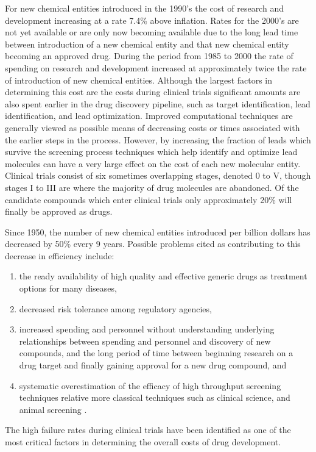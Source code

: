For new chemical entities introduced in the 1990's the cost of research and development increasing at a rate 7.4\% above inflation.
Rates for the 2000's are not yet available or are only now becoming available due to the long lead time between introduction of a new chemical entity and that new chemical entity becoming an approved drug.
During the period from 1985 to 2000 the rate of spending on research and development increased at approximately twice the rate of introduction of new chemical entities.
Although the largest factors in determining this cost are the costs during clinical trials significant amounts are also spent earlier in the drug discovery pipeline, such as target identification, lead identification, and lead optimization.
Improved computational techniques are generally viewed as possible means of decreasing costs or times associated with the earlier steps in the process.
However, by increasing the fraction of leads which survive the screening process techniques which help identify and optimize lead molecules can have a very large effect on the cost of each new molecular entity.
Clinical trials consist of six sometimes overlapping stages, denoted 0 to V, though stages I to III are where the majority of drug molecules are abandoned.
Of the candidate compounds which enter clinical trials only approximately 20\% will finally be approved as drugs.
\cite{dimasi2003price}

Since 1950, the number of new chemical entities introduced per billion dollars has decreased by 50\% every 9 years.
Possible problems cited as contributing to this decrease in efficiency include:
\begin{enumerate}
  \item the ready availability of high quality and effective generic drugs as treatment options for many diseases,
  \item decreased risk tolerance among regulatory agencies,
  \item increased spending and personnel without understanding underlying relationships between spending and personnel and discovery of new compounds, and the long period of time between beginning research on a drug target and finally gaining approval for a new drug compound, and
  \item systematic overestimation of the efficacy of high throughput screening techniques relative more classical techniques such as clinical science, and animal screening \cite{scannell2012diagnosing}.
\end{enumerate}

The high failure rates during clinical trials have been identified as one of the most critical factors in determining the overall costs of drug development.
\cite{bleicher2003hit}

